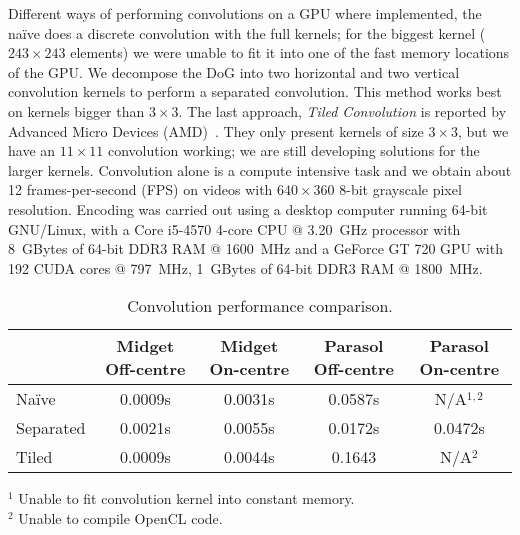 Different ways of performing convolutions on a GPU where implemented, the naïve
does a discrete convolution with the full kernels; for the biggest kernel 
($243\times243$ elements) we were unable to fit it into one of the fast memory
locations of the GPU. We decompose the DoG into two horizontal and two vertical
convolution kernels to perform a separated convolution. This method works best 
on kernels bigger than $3\times3$. The last approach, \emph{Tiled Convolution} 
is reported by Advanced Micro Devices (AMD)~\cite{tiled-convolution}. They only 
present kernels of size $3\times3$, but we have an $11\times11$ convolution 
working; we are still developing solutions for the larger kernels.
Convolution alone is a compute intensive task and we 
obtain about 12 frames-per-second (FPS) on videos with $640\times360$ 8-bit 
grayscale pixel resolution. Encoding was carried out using a desktop computer 
running 64-bit GNU/Linux, with a Core i5-4570 4-core CPU @ 3.20~GHz processor 
with 8~GBytes of 64-bit DDR3 RAM @ 1600~MHz and a GeForce GT 720 GPU with 192 
CUDA cores @ 797~MHz, 1~GBytes of 64-bit DDR3 RAM @ 1800~MHz. %

\begin{table}
  \begin{center}
      \caption{Convolution performance comparison.}
      \bgroup
      \def\arraystretch{1.4}
      \begin{tabular}{l c c c c}
        &
        \begin{minipage}{1.2cm}Midget Off-centre\vspace*{0.05cm}\end{minipage} & 
        \begin{minipage}{1.2cm}Midget On-centre\vspace*{0.05cm}\end{minipage}& 
        \begin{minipage}{1.2cm}Parasol Off-centre\vspace*{0.05cm}\end{minipage}& 
        \begin{minipage}{1.2cm}Parasol On-centre\vspace*{0.05cm}\end{minipage}\\
        \hline 
        
        Naïve     & 0.0009s & 0.0031s & 0.0587s & N/A$^{1,2}$ \\ 
        Separated & 0.0021s & 0.0055s & 0.0172s & 0.0472s \\ 
        Tiled     & 0.0009s & 0.0044s & 0.1643 & N/A$^2$\\
      \end{tabular} 
      \egroup
  {
    \footnotesize 
    \begin{center}
       $^1$ Unable to fit convolution kernel into constant memory.\\
       $^2$ Unable to compile OpenCL code.
    \end{center}
  }
  \end{center}
  \vspace*{-5pt}
\end{table}


